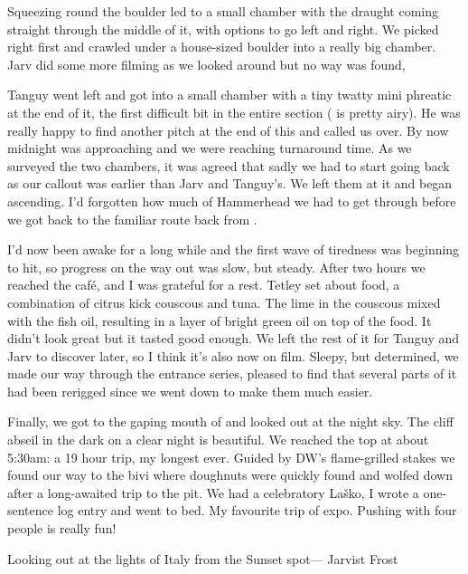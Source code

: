 Squeezing round the boulder led to a small chamber with the draught coming straight through the middle of it, with options to go left and right. We picked right first and crawled under a house-sized boulder into a really big chamber. Jarv did some more filming as we looked around but no way was found,  

Tanguy went left and got into a small chamber with a tiny twatty mini phreatic at the end of it, the first difficult bit in the entire section ( is pretty airy). He was really happy to find another pitch at the end of this and called us over. By now midnight was approaching and we were reaching turnaround time. As we surveyed the two chambers, it was agreed that sadly we had to start going back as our callout was earlier than Jarv and Tanguy's. We left them at it and began ascending. I'd forgotten how much of Hammerhead we had to get through before we got back to the familiar route back from .

I'd now been awake for a long while and the first wave of tiredness was beginning to hit, so progress on the way out was slow, but steady. After two hours we reached the café, and I was grateful for a rest. Tetley set about food, a combination of citrus kick couscous and tuna. The lime in the couscous mixed with the fish oil, resulting in a layer of bright green oil on top of the food. It didn't look great but it tasted good enough. We left the rest of it for Tanguy and Jarv to discover later, so I think it's also now on film.  Sleepy, but determined, we made our way through the entrance series, pleased to find that several parts of it had been rerigged since we went down to make them much easier. 

Finally, we got to the gaping mouth of  and looked out at the night sky. The cliff abseil in the dark on a clear night is beautiful. We reached the top at about 5:30am: a 19 hour trip, my longest ever. Guided by DW's flame-grilled stakes we found our way to the bivi where doughnuts were quickly found and wolfed down after a long-awaited trip to the pit. We had a celebratory Laško, I wrote a one-sentence log entry and went to bed. My favourite trip of expo. Pushing with four people is really fun!


\begin{pagefigure}
	\checkoddpage \ifoddpage \forcerectofloat \else \forceversofloat \fi
	\centering
  	\caption{Looking out at the lights of Italy from the Sunset spot--- Jarvist Frost}
\end{pagefigure}
